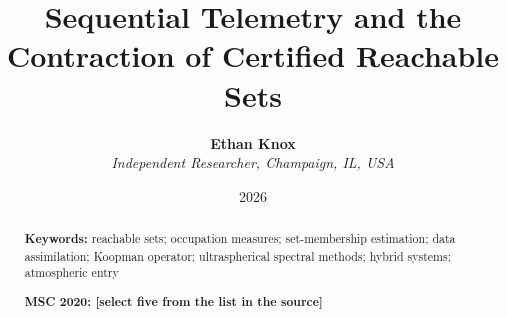 \documentclass[english,11pt]{extarticle}
\begin{document}
\title{\textbf{Sequential Telemetry and the Contraction of Certified Reachable Sets}}
\author{\textbf{Ethan Knox}\\
\textit{Independent Researcher, Champaign, IL, USA}}
\date{2026}
\maketitle

\begin{abstract}


\bigskip{}

\textbf{Keywords:} reachable sets; occupation measures; set-membership
estimation; data assimilation; Koopman operator; ultraspherical spectral
methods; hybrid systems; atmospheric entry

\medskip{}
\noindent\textbf{MSC 2020: [select five from the list in the source]}

\end{abstract}
\pagebreak{}

\tableofcontents{}
\pagebreak{}

\pagebreak{}


\pagebreak{}


\pagebreak{}


\pagebreak{}


\pagebreak{}


\pagebreak{}


\pagebreak{}


\pagebreak{}



\pagebreak{}

\appendix




\end{document}
